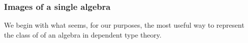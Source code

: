 \subsubsection{Images of a single algebra}\label{images-of-a-single-algebra}

We begin with what seems, for our purposes, the most useful way to represent the class of  of an algebra in dependent type theory.
\ccpad
\begin{code}%
\>[0]\AgdaSpace{}%
\AgdaModule{\AgdaUnderscore{}}\AgdaSpace{}%
\AgdaSymbol{\{}\AgdaSpace{}%
\AgdaSpace{}%
\AgdaSymbol{:}\AgdaSpace{}%
\AgdaSymbol{\}}\AgdaSpace{}%
\<%
\\
%
\\[\AgdaEmptyExtraSkip]%
\>[0][@{}l@{\AgdaIndent{0}}]%
\>[1]\AgdaSpace{}%
\AgdaSymbol{:}\AgdaSpace{}%
\AgdaSymbol{\{}\AgdaSpace{}%
\AgdaSymbol{:}\AgdaSpace{}%
\AgdaSpace{}%
\AgdaSpace{}%
\AgdaSymbol{\}(}\AgdaSpace{}%
\AgdaSymbol{:}\AgdaSpace{}%
\AgdaSpace{}%
\AgdaSpace{}%
\AgdaSymbol{)(}\AgdaSpace{}%
\AgdaSymbol{:}\AgdaSpace{}%
\AgdaSpace{}%
\AgdaSpace{}%
\AgdaSymbol{)}\AgdaSpace{}%
\AgdaSpace{}%
\AgdaSpace{}%
\AgdaSpace{}%
\AgdaSpace{}%
\AgdaSpace{}%
\AgdaSpace{}%
\AgdaSpace{}%
\AgdaSpace{}%
\<%
\\
%
\>[1]\AgdaSpace{}%
\AgdaSpace{}%
\AgdaSpace{}%
\AgdaSymbol{=}\AgdaSpace{}%
\AgdaSpace{}%
\AgdaSpace{}%
\AgdaSpace{}%
\AgdaSpace{}%
\AgdaSpace{}%
\AgdaSpace{}%
\AgdaSpace{}%
\AgdaSpace{}%
\<%
\\
%
\\[\AgdaEmptyExtraSkip]%
%
\>[1]\AgdaSpace{}%
\AgdaSymbol{:}\AgdaSpace{}%
\AgdaSpace{}%
\AgdaSpace{}%
\AgdaSpace{}%
\AgdaSpace{}%
\AgdaSpace{}%
\AgdaSpace{}%
\AgdaSpace{}%

\end{code}
